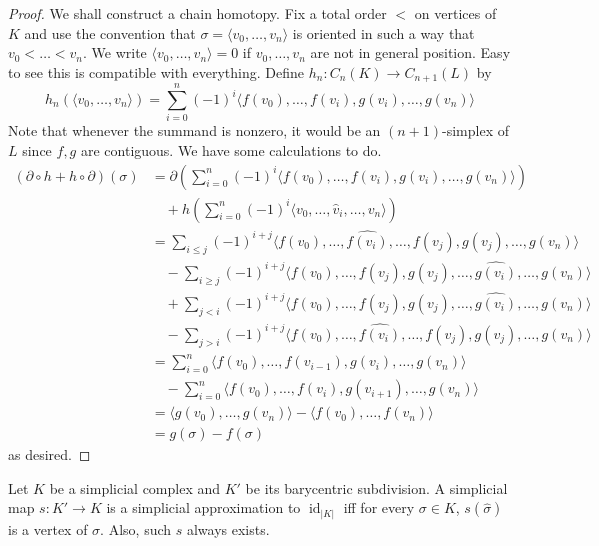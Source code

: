 \begin{proof}
    We shall construct a chain homotopy.
    Fix a total order $<$ on vertices of $K$ and use the convention that $\sigma=\langle v_0,\ldots,v_n\rangle$ is oriented in such a way that $v_0<\ldots<v_n$.
    We write $\langle v_0,\ldots,v_n\rangle=0$ if $v_0,\ldots,v_n$ are not in general position.
    Easy to see this is compatible with everything.
    Define $h_n:C_n(K)\to C_{n+1}(L)$ by
    $$h_n(\langle v_0,\ldots,v_n\rangle)=\sum_{i=0}^n(-1)^i\langle f(v_0),\ldots,f(v_i),g(v_i),\ldots,g(v_n)\rangle$$
    Note that whenever the summand is nonzero, it would be an $(n+1)$-simplex of $L$ since $f,g$ are contiguous.
    We have some calculations to do.
    \begin{align*}
        (\partial\circ h+h\circ\partial)(\sigma)&=\partial\left( \sum_{i=0}^n(-1)^i\langle f(v_0),\ldots,f(v_i),g(v_i),\ldots,g(v_n)\rangle \right)\\
        &\quad+h\left( \sum_{i=0}^n(-1)^i\langle v_0,\ldots,\hat{v}_i,\ldots,v_n\rangle \right)\\
        &=\sum_{i\le j}(-1)^{i+j}\langle f(v_0),\ldots,\widehat{f(v_i)},\ldots,f(v_j),g(v_j),\ldots,g(v_n)\rangle\\
        &\quad-\sum_{i\ge j}(-1)^{i+j}\langle f(v_0),\ldots, f(v_j),g(v_j),\ldots,\widehat{g(v_i)},\ldots,g(v_n)\rangle\\
        &\quad+\sum_{j<i}(-1)^{i+j}\langle f(v_0),\ldots, f(v_j),g(v_j),\ldots,\widehat{g(v_i)},\ldots,g(v_n)\rangle\\
        &\quad-\sum_{j>i}(-1)^{i+j}\langle f(v_0),\ldots,\widehat{f(v_i)},\ldots,f(v_j),g(v_j),\ldots,g(v_n)\rangle\\
        &=\sum_{i=0}^n\langle f(v_0),\ldots,f(v_{i-1}),g(v_i),\ldots,g(v_n)\rangle\\
        &\quad-\sum_{i=0}^n\langle f(v_0),\ldots,f(v_i),g(v_{i+1}),\ldots,g(v_n)\rangle\\
        &=\langle g(v_0),\ldots,g(v_n)\rangle-\langle f(v_0),\ldots,f(v_n)\rangle\\
        &=g(\sigma)-f(\sigma)
    \end{align*}
    as desired.
\end{proof}
\begin{lemma}
    Let $K$ be a simplicial complex and $K'$ be its barycentric subdivision.
    A simplicial map $s:K'\to K$ is a simplicial approximation to $\operatorname{id}_{|K|}$ iff for every $\sigma\in K$, $s(\hat\sigma)$ is a vertex of $\sigma$.
    Also, such $s$ always exists.
\end{lemma}

